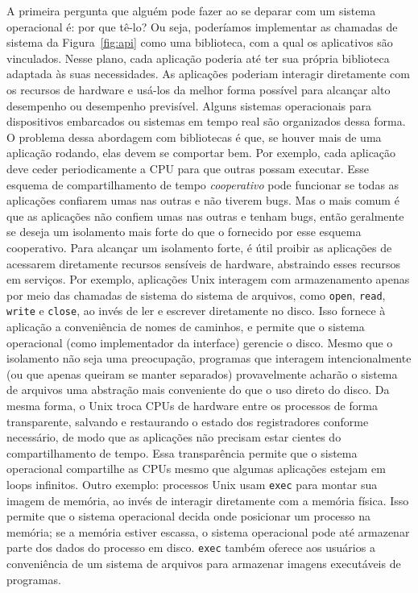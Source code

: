 A primeira pergunta que alguém pode fazer ao se deparar com um sistema operacional é: por que tê-lo? Ou seja, poderíamos implementar as chamadas de sistema da Figura~\ref{fig:api} como uma biblioteca, com a qual os aplicativos são vinculados. Nesse plano, cada aplicação poderia até ter sua própria biblioteca adaptada às suas necessidades. As aplicações poderiam interagir diretamente com os recursos de hardware e usá-los da melhor forma possível para alcançar alto desempenho ou desempenho previsível. Alguns sistemas operacionais para dispositivos embarcados ou sistemas em tempo real são organizados dessa forma.
O problema dessa abordagem com bibliotecas é que, se houver mais de uma aplicação rodando, elas devem se comportar bem. Por exemplo, cada aplicação deve ceder periodicamente a CPU para que outras possam executar. Esse esquema de compartilhamento de tempo \textit{cooperativo} pode funcionar se todas as aplicações confiarem umas nas outras e não tiverem bugs. Mas o mais comum é que as aplicações não confiem umas nas outras e tenham bugs, então geralmente se deseja um isolamento mais forte do que o fornecido por esse esquema cooperativo.
Para alcançar um isolamento forte, é útil proibir as aplicações de acessarem diretamente recursos sensíveis de hardware, abstraindo esses recursos em serviços. Por exemplo, aplicações Unix interagem com armazenamento apenas por meio das chamadas de sistema do sistema de arquivos, como \lstinline{open}, \lstinline{read}, \lstinline{write} e \lstinline{close}, ao invés de ler e escrever diretamente no disco. Isso fornece à aplicação a conveniência de nomes de caminhos, e permite que o sistema operacional (como implementador da interface) gerencie o disco. Mesmo que o isolamento não seja uma preocupação, programas que interagem intencionalmente (ou que apenas queiram se manter separados) provavelmente acharão o sistema de arquivos uma abstração mais conveniente do que o uso direto do disco.
Da mesma forma, o Unix troca CPUs de hardware entre os processos de forma transparente, salvando e restaurando o estado dos registradores conforme necessário, de modo que as aplicações não precisam estar cientes do compartilhamento de tempo. Essa transparência permite que o sistema operacional compartilhe as CPUs mesmo que algumas aplicações estejam em loops infinitos.
Outro exemplo: processos Unix usam \lstinline{exec} para montar sua imagem de memória, ao invés de interagir diretamente com a memória física. Isso permite que o sistema operacional decida onde posicionar um processo na memória; se a memória estiver escassa, o sistema operacional pode até armazenar parte dos dados do processo em disco. \lstinline{exec} também oferece aos usuários a conveniência de um sistema de arquivos para armazenar imagens executáveis de programas.
